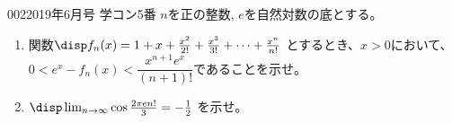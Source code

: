 \begin{prob}{002}{}{2019年6月号 学コン5番}
 $n$を正の整数, $e$を自然対数の底とする。
 \begin{enumerate}
  \item 関数$\disp f_n(x)=1+x+\frac{x^2}{2!}+\frac{x^3}{3!}+\dots +\frac{x^n}{n!}$ とするとき、$x>0$において、$0<e^x-f_n(x)<\dfrac{x^{n+1}e^x}{(n+1)!}$であることを示せ。
  \item $\disp \lim_{n\to\infty} \cos\frac{2\pi e n!}{3}=-\frac{1}{2}$ を示せ。
 \end{enumerate}
\end{prob}
